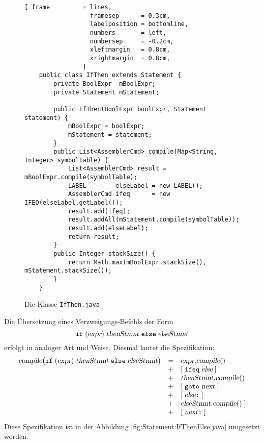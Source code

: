 \begin{figure}[!ht]
\centering
\begin{Verbatim}[ frame         = lines, 
                  framesep      = 0.3cm, 
                  labelposition = bottomline,
                  numbers       = left,
                  numbersep     = -0.2cm,
                  xleftmargin   = 0.8cm,
                  xrightmargin  = 0.8cm,
                ]
    public class IfThen extends Statement {
        private BoolExpr  mBoolExpr;
        private Statement mStatement;
    
        public IfThen(BoolExpr boolExpr, Statement statement) {
            mBoolExpr = boolExpr;
            mStatement = statement;
        }
        public List<AssemblerCmd> compile(Map<String, Integer> symbolTable) {
            List<AssemblerCmd> result = mBoolExpr.compile(symbolTable);
            LABEL        elseLabel = new LABEL();
            AssemblerCmd ifeq      = new IFEQ(elseLabel.getLabel());
            result.add(ifeq);
            result.addAll(mStatement.compile(symbolTable));
            result.add(elseLabel);
            return result;
        }
        public Integer stackSize() {
            return Math.max(mBoolExpr.stackSize(), mStatement.stackSize());
        }
    }
\end{Verbatim}
\vspace*{-0.3cm}
\caption{Die Klasse \texttt{IfThen.java}}
\label{fig:Statement:IfThen.java}
\end{figure}

\vspace*{0.1cm}

Die \"Ubersetzung eines Verzweigungs-Befehls der Form
\[ \texttt{if}\; (\textsl{expr})\; \textsl{thenStmnt} \;\texttt{else}\; \textsl{elseStmnt} \]
erfolgt in analoger Art und Weise.  Diesmal lautet die Spezifikation:
\[
   \begin{array}[t]{lcl}
   \textsl{compile}\bigl(\texttt{if}\; (\textsl{expr})\;\textsl{thenStmnt}\;\texttt{else}\;\textsl{elseStmnt}\bigr) & = & 
         \textsl{expr}.\textsl{compile}()  \\
   & + & [\;\texttt{ifeq}\;\textsl{else}\;] \\
   & + & \textsl{thenStmnt}.\textsl{compile}() \\
   & + & [\;\texttt{goto}\;\textsl{next}\;]    \\    
   & + & [\;\textsl{else}\texttt{:}\;]         \\
   & + & \textsl{elseStmnt}.\textsl{compile}()\;]    \\    
   & + & [\;\textsl{next}\texttt{:}\;]         
\end{array}
\]
Diese Spezifikation ist in der Abbildung \ref{fig:Statement:IfThenElse.java} umgesetzt worden.

